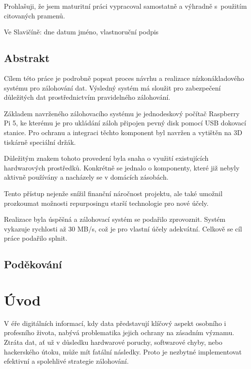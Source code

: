 \documentclass[a4paper,12pt, oneside]{book}
\begin{document}
\newpage
\mbox{}
\newpage


\noindent
Prohlašuji, že jsem maturitní práci vypracoval samostatně
a výhradně s použitím citovaných pramenů.

Ve Slavičíně: dne datum jméno, vlastnoruční podpis


\newpage
\section*{Abstrakt}

Cílem této práce je podrobně popsat proces návrhu a realizace nízkonákladového
systému pro zálohování dat.  Výsledný systém má sloužit pro zabezpečení důležitých
dat prostřednictvím pravidelného zálohování.

Základem navrženého zálohovacího systému je jednodeskový počítač Raspberry Pi 5,
ke kterému je pro ukládání záloh připojen pevný disk pomocí USB
dokovací stanice. Pro ochranu a integraci těchto komponent byl navržen a
vytištěn na 3D tiskárně speciální držák. 

Důležitým znakem tohoto provedení byla snaha o využití existujících
hardwarových prostředků. Konkrétně se jednalo o komponenty, které již nebyly
aktivně používány a nacházely se v domácích zásobách.

Tento přístup nejenže snížil finanční náročnost projektu, ale také umožnil
prozkoumat možnosti repurposingu starší technologie pro nové účely.

Realizace byla úspěšná a zálohovací systém se podařilo zprovoznit. Systém
vykazuje rychlosti až 30 MB/s, což je pro vlastní účely adekvátní. Celkově 
se cíl práce podařilo splnit.

\newpage
\section*{Poděkování}

\tableofcontents

\clearpage

\chapter{Úvod}

V éře digitálních informací, kdy data představují klíčový aspekt osobního i
profesního života, nabývá problematika jejich ochrany na zásadním významu.
Ztráta dat, ať už v důsledku hardwarové poruchy, softwarové chyby, nebo
hackerského útoku, může mít fatální následky. Proto je nezbytné implementovat
efektivní a spolehlivé strategie zálohování.
\end{document}
